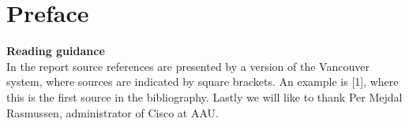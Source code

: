 \chapter*{Preface}

\textbf{Reading guidance}\\


In the report source references are presented by a version of the Vancouver system, where sources are indicated by square brackets. An example is [1], where this is the first source in the bibliography.
Lastly we will like to thank Per Mejdal Rasmussen, administrator of Cisco at AAU. 

\begin{multicols}{2}
\signature{Oliver B. Købsted}
\signature{Anders L. Matthiassen}
\signature{Jacob Nielsen}
\signature{Simon A. Pedersen}
\end{multicols}